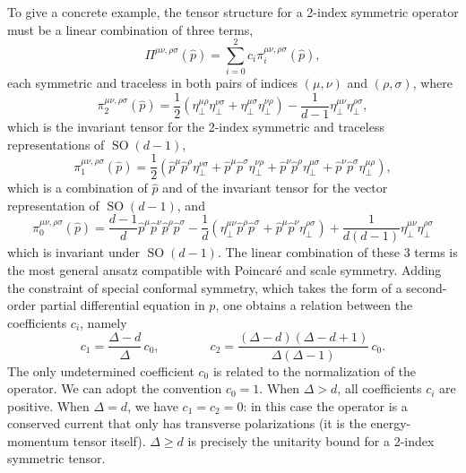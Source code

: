 \documentclass[a4paper,12pt]{article}
\DeclareMathOperator{\SO}{\text{SO}}
\begin{document}
To give a concrete example, the tensor structure for a 2-index symmetric operator must be a linear combination of three terms,
\begin{equation}
	\Pi^{\mu\nu,\rho\sigma}(\hat{p})
	= \sum_{i = 0}^2 c_i \pi_i^{\mu\nu,\rho\sigma}(\hat{p}),
\end{equation}
each symmetric and traceless in both pairs of indices $(\mu,\nu)$ and $(\rho, \sigma)$,
where
\begin{equation}
	\pi_2^{\mu\nu,\rho\sigma}(\hat{p})
	= \frac{1}{2} \left( \eta_\perp^{\mu\rho} \eta_\perp^{\nu\sigma}
	+ \eta_\perp^{\mu\sigma} \eta_\perp^{\nu\rho} \right)
	- \frac{1}{d-1} \eta_\perp^{\mu\nu} \eta_\perp^{\rho\sigma},
	\label{eq:pi:2index:2}
\end{equation}
which is the invariant tensor for the 2-index symmetric and traceless representations of $\SO(d-1)$,
\begin{equation}
	\pi_1^{\mu\nu,\rho\sigma}(\hat{p})
	= \frac{1}{2} \left(
	\hat{p}^\mu \hat{p}^\rho \eta_\perp^{\nu\sigma}
	+ \hat{p}^\mu \hat{p}^\sigma \eta_\perp^{\nu\rho}
	+ \hat{p}^\nu \hat{p}^\rho \eta_\perp^{\mu\sigma}
	+ \hat{p}^\nu \hat{p}^\sigma \eta_\perp^{\mu\rho} \right),
	\label{eq:pi:2index:1}
\end{equation}
which is a combination of $\hat{p}$ and of the invariant tensor for the vector representation of $\SO(d-1)$, and
\begin{equation}
	\pi_0^{\mu\nu,\rho\sigma}(\hat{p})
	= \frac{d-1}{d} \hat{p}^\mu \hat{p}^\nu \hat{p}^\rho \hat{p}^\sigma
	- \frac{1}{d} \left( 
	\eta_\perp^{\mu\nu} \hat{p}^\rho \hat{p}^\sigma
	+ \hat{p}^\mu \hat{p}^\nu \eta_\perp^{\rho \sigma} \right)
	+ \frac{1}{d (d-1)} \eta_\perp^{\mu\nu} \eta_\perp^{\rho \sigma}
	\label{eq:pi:2index:0}
\end{equation}
which is invariant under $\SO(d-1)$.
The linear combination of these 3 terms is the most general ansatz compatible with Poincar\'e and scale symmetry. Adding the constraint of special conformal symmetry, which takes the form of a second-order partial differential equation in $p$, one obtains a relation between the coefficients $c_i$, namely
\begin{equation}
	c_1 = \frac{\Delta - d}{\Delta} \, c_0,
	\qquad\qquad
	c_2 = 
	\frac{(\Delta - d) (\Delta - d + 1)}{\Delta (\Delta - 1)} \, c_0.
	\label{eq:c:twoindex}
\end{equation}
The only undetermined coefficient $c_0$ is related to the normalization of the operator. We can adopt the convention $c_0 = 1$. When $\Delta > d$, all coefficients $c_i$ are positive. When $\Delta = d$, we have $c_1 = c_2 = 0$: in this case the operator is a conserved current that only has transverse polarizations (it is the energy-momentum tensor itself). $\Delta \geq d$ is precisely the unitarity bound for a 2-index symmetric tensor.
\end{document}
